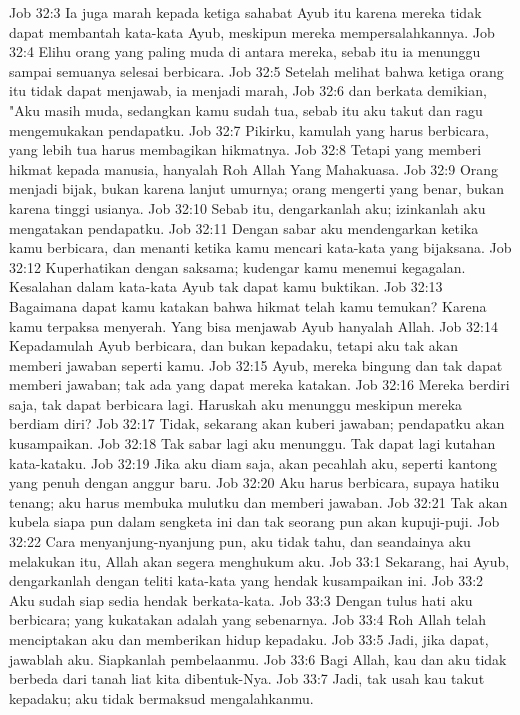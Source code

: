 Job 32:3  Ia juga marah kepada ketiga sahabat Ayub itu karena mereka tidak dapat membantah kata-kata Ayub, meskipun mereka mempersalahkannya.
Job 32:4  Elihu orang yang paling muda di antara mereka, sebab itu ia menunggu sampai semuanya selesai berbicara.
Job 32:5  Setelah melihat bahwa ketiga orang itu tidak dapat menjawab, ia menjadi marah,
Job 32:6  dan berkata demikian, "Aku masih muda, sedangkan kamu sudah tua, sebab itu aku takut dan ragu mengemukakan pendapatku.
Job 32:7  Pikirku, kamulah yang harus berbicara, yang lebih tua harus membagikan hikmatnya.
Job 32:8  Tetapi yang memberi hikmat kepada manusia, hanyalah Roh Allah Yang Mahakuasa.
Job 32:9  Orang menjadi bijak, bukan karena lanjut umurnya; orang mengerti yang benar, bukan karena tinggi usianya.
Job 32:10  Sebab itu, dengarkanlah aku; izinkanlah aku mengatakan pendapatku.
Job 32:11  Dengan sabar aku mendengarkan ketika kamu berbicara, dan menanti ketika kamu mencari kata-kata yang bijaksana.
Job 32:12  Kuperhatikan dengan saksama; kudengar kamu menemui kegagalan. Kesalahan dalam kata-kata Ayub tak dapat kamu buktikan.
Job 32:13  Bagaimana dapat kamu katakan bahwa hikmat telah kamu temukan? Karena kamu terpaksa menyerah. Yang bisa menjawab Ayub hanyalah Allah.
Job 32:14  Kepadamulah Ayub berbicara, dan bukan kepadaku, tetapi aku tak akan memberi jawaban seperti kamu.
Job 32:15  Ayub, mereka bingung dan tak dapat memberi jawaban; tak ada yang dapat mereka katakan.
Job 32:16  Mereka berdiri saja, tak dapat berbicara lagi. Haruskah aku menunggu meskipun mereka berdiam diri?
Job 32:17  Tidak, sekarang akan kuberi jawaban; pendapatku akan kusampaikan.
Job 32:18  Tak sabar lagi aku menunggu. Tak dapat lagi kutahan kata-kataku.
Job 32:19  Jika aku diam saja, akan pecahlah aku, seperti kantong yang penuh dengan anggur baru.
Job 32:20  Aku harus berbicara, supaya hatiku tenang; aku harus membuka mulutku dan memberi jawaban.
Job 32:21  Tak akan kubela siapa pun dalam sengketa ini dan tak seorang pun akan kupuji-puji.
Job 32:22  Cara menyanjung-nyanjung pun, aku tidak tahu, dan seandainya aku melakukan itu, Allah akan segera menghukum aku.
Job 33:1  Sekarang, hai Ayub, dengarkanlah dengan teliti kata-kata yang hendak kusampaikan ini.
Job 33:2  Aku sudah siap sedia hendak berkata-kata.
Job 33:3  Dengan tulus hati aku berbicara; yang kukatakan adalah yang sebenarnya.
Job 33:4  Roh Allah telah menciptakan aku dan memberikan hidup kepadaku.
Job 33:5  Jadi, jika dapat, jawablah aku. Siapkanlah pembelaanmu.
Job 33:6  Bagi Allah, kau dan aku tidak berbeda dari tanah liat kita dibentuk-Nya.
Job 33:7  Jadi, tak usah kau takut kepadaku; aku tidak bermaksud mengalahkanmu.
